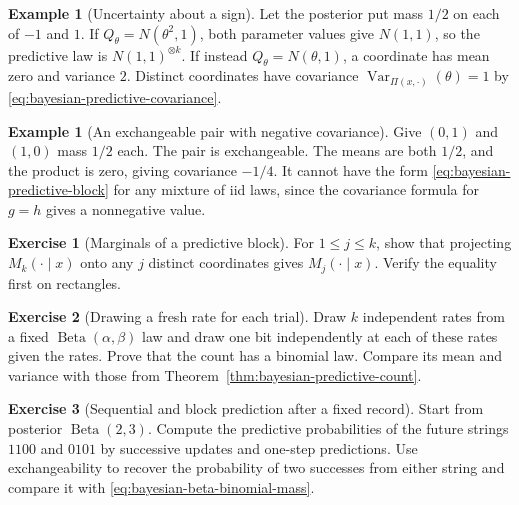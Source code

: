 \documentclass[11pt,oneside]{book}
\theoremstyle{definition}
\newtheorem{example}[theorem]{Example}
\newtheorem{exercise}{Exercise}[section]
\theoremstyle{remark}
\begin{document}
\begin{example}[Uncertainty about a sign]
\label{ex:bayesian-predictive-unidentified-sign}
Let the posterior put mass $1/2$ on each of $-1$ and $1$.
If $Q_\theta=N(\theta^2,1)$, both parameter values give $N(1,1)$,
so the predictive law is $N(1,1)^{\otimes k}$. If instead
$Q_\theta=N(\theta,1)$, a coordinate has mean zero and variance $2$.
Distinct coordinates have covariance $\operatorname{Var}_{\Pi(x,\cdot)}
(\theta)=1$ by \eqref{eq:bayesian-predictive-covariance}.
\end{example}

\begin{example}[An exchangeable pair with negative covariance]
\label{ex:bayesian-exchangeable-pair-negative-covariance}
Give $(0,1)$ and $(1,0)$ mass $1/2$ each. The pair is exchangeable.
The means are both $1/2$, and the product is zero, giving covariance
$-1/4$. It cannot have the form \eqref{eq:bayesian-predictive-block}
for any mixture of iid laws, since the covariance formula for
$g=h$ gives a nonnegative value.
\end{example}

\begin{exercise}[Marginals of a predictive block]
\label{exer:bayesian-predictive-block-marginals}
For $1\leq j\leq k$, show that projecting $M_k(\cdot\mid x)$
onto any $j$ distinct coordinates gives $M_j(\cdot\mid x)$.
Verify the equality first on rectangles.
\end{exercise}

\begin{exercise}[Drawing a fresh rate for each trial]
\label{exer:bayesian-predictive-fresh-rates}
Draw $k$ independent rates from a fixed $\operatorname{Beta}(\alpha,\beta)$
law and draw one bit independently at each of these rates given
the rates. Prove that the count has a binomial law. Compare its
mean and variance with those from Theorem~\ref{thm:bayesian-predictive-count}.
\end{exercise}

\begin{exercise}[Sequential and block prediction after a fixed record]
\label{exer:bayesian-predictive-sequential-block}
Start from posterior $\operatorname{Beta}(2,3)$. Compute the
predictive probabilities of the future strings $1100$ and $0101$
by successive updates and one-step predictions. Use exchangeability to recover the
probability of two successes from either string and compare it
with \eqref{eq:bayesian-beta-binomial-mass}.
\end{exercise}
\end{document}
